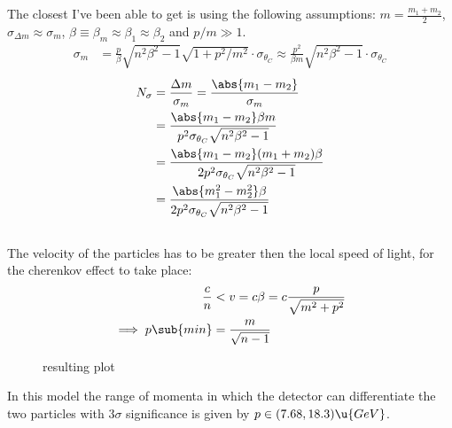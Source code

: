 \documentclass[exb, en]{exercise_5.0}
\begin{document}
The closest I've been able to get is using the following assumptions: $m = \frac{m_1 + m_2}{2}$, $\sigma_{\Delta m}\approx \sigma_{m}$, $\beta\equiv\beta_m\approx\beta_1\approx \beta_2$ and $p/m\gg1$.
\begin{align*}
    \sigma_m
    &= \frac{p}{\beta}\sqrt{n^2\beta^2- 1}\sqrt{1 + p^2/m^2}\cdot \sigma_{\theta_C}\approx \frac{p^2}{\beta m}\sqrt{n^2\beta^2- 1}\cdot \sigma_{\theta_C}
\end{align*}
\begin{align*}
    N_\sigma &= \frac{\Delta m}{\sigma_{m}} 
    = \frac{\abs{m_1-m_2}}{\sigma_{m}}\\
    &= \frac{\abs{m_1-m_2}\beta m }{p^2\sigma_{\theta_C} \sqrt{n^2\beta^2-1}}\\
    &= \frac{\abs{m_1-m_2}(m_1+m_2)\beta}{2p^2\sigma_{\theta_C} \sqrt{n^2\beta^2-1}}\\
    &= \frac{\abs{m_1^2-m_2^2}\beta}{2p^2\sigma_{\theta_C} \sqrt{n^2\beta^2-1}}
\end{align*}

\subsection{}

The velocity of the particles has to be greater then the local speed of light, for the cherenkov effect to take place:
\begin{align*}
    \frac{c}{n} &< v= c\beta = c\frac{p}{\sqrt{m^2 + p^2}} \\
    \implies p\sub{min} &= \frac{m}{\sqrt{n-1}}
\end{align*}

\begin{figure}[H]
    \centering
    
    \caption{resulting plot}
\end{figure}

In this model the range of momenta in which the detector can differentiate the two particles with $3\sigma$ significance is given by $p\in(7.68, 18.3)\u{GeV}$.
\end{document}
